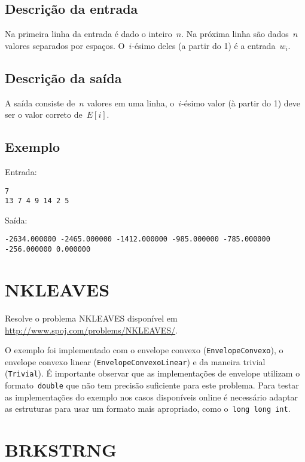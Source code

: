 \subsection*{Descrição da entrada}
Na primeira linha da entrada é dado o inteiro~$n$. Na próxima linha são dados~$n$ valores separados por espaços. O~$i$-ésimo deles (a partir do 1) é a entrada~$w_i$.

\subsection*{Descrição da saída}
A saída consiste de~$n$ valores em uma linha, o~$i$-ésimo valor (à partir do 1) deve ser o valor correto de~$E[i]$.

\subsection*{Exemplo}
Entrada:
\begin{verbatim}
7
13 7 4 9 14 2 5
\end{verbatim}
Saída:
\begin{verbatim}
-2634.000000 -2465.000000 -1412.000000 -985.000000 -785.000000 -256.000000 0.000000
\end{verbatim}


\section{NKLEAVES} \label{NKLEAVES}

Resolve o problema NKLEAVES disponível em \href{http://www.spoj.com/problems/NKLEAVES/}{http://www.spoj.com/problems/NKLEAVES/}.

O exemplo foi implementado com o envelope convexo (\texttt{EnvelopeConvexo}), o envelope convexo linear (\texttt{EnvelopeConvexoLinear}) e da maneira trivial (\texttt{Trivial}). É importante observar que as implementações de envelope utilizam o formato~\texttt{double} que não tem precisão suficiente para este problema. Para testar as implementações do exemplo nos casos disponíveis online é necessário adaptar as estruturas para usar um formato mais apropriado, como o~\texttt{long long int}.


\section{BRKSTRNG} \label{BRKSTRNG}

